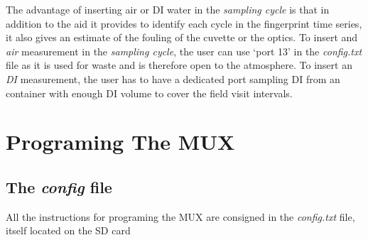 \documentclass[]{book}
\begin{document}
The advantage of inserting air or DI water in the \emph{sampling cycle} is that in addition to the aid it provides to identify each cycle in the fingerprint time series, it also gives an estimate of the fouling of the cuvette or the optics. To insert and \emph{air} measurement in the \emph{sampling cycle}, the user can use `port 13' in the \emph{config.txt} file as it is used for waste and is therefore open to the atmosphere. To insert an \emph{DI} measurement, the user has to have a dedicated port sampling DI from an container with enough DI volume to cover the field visit intervals.

\hypertarget{programing-the-mux}{%
\chapter{Programing The MUX}\label{programing-the-mux}}

\hypertarget{the-config-file}{%
\section{\texorpdfstring{The \emph{config} file}{The config file}}\label{the-config-file}}

All the instructions for programing the MUX are consigned in the \emph{config.txt} file, itself located on the SD card


\end{document}
